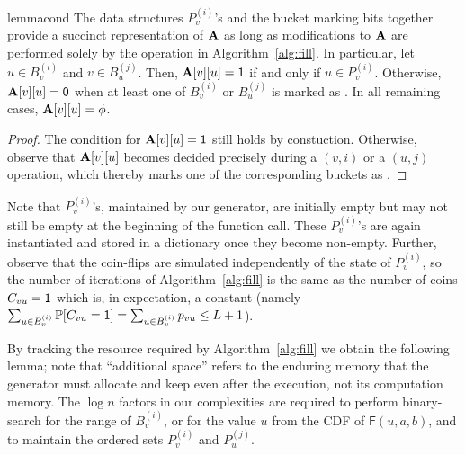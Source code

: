 \begin{restatable}{lemma}{cond}\label{lem:cond-0-fill}
The data structures $P_v^{(i)}$'s and the bucket marking bits together provide a succinct representation of $\mathbf{A}$ as long as modifications to $\mathbf{A}$ are performed solely by the  operation in Algorithm~\ref{alg:fill}. In particular, let $u \in B^{(i)}_v$ and $v \in B_u^{(j)}$. Then, $\mathbf{A}[v][u]=\mathsf{1}$ if and only if $u \in P_v^{(i)}$. Otherwise, $\mathbf{A}[v][u]=\mathsf{0}$ when at least one of $B^{(i)}_v$ or $B_u^{(j)}$ is marked as \filled. In all remaining cases, $\mathbf{A}[v][u]=\phi$.
\end{restatable}
\begin{proof}
The condition for $\mathbf{A}[v][u]=\mathsf{1}$ still holds by constuction. Otherwise, observe that $\mathbf{A}[v][u]$ becomes decided precisely during a $(v,i)$ or a $(u,j)$ operation, which thereby marks one of the corresponding buckets as \filled.
\end{proof}


Note that $P_v^{(i)}$'s, maintained by our generator, are initially empty but may not still be empty at the beginning of the  function call. These $P_v^{(i)}$'s are again instantiated and stored in a dictionary once they become non-empty.
Further, observe that the coin-flips are simulated independently of the state of $P_v^{(i)}$, so the number of iterations of Algorithm~\ref{alg:fill} is the same as the number of coins $C_{vu} = \mathsf{1}$ which is, in expectation, a constant (namely $\sum_{u\in B^{(i)}_v} \mathbb P[C_{vu}=\mathsf{1}] = \sum_{u\in B^{(i)}_v} p_{vu} \leq L+1$). %



By tracking the resource required by Algorithm~\ref{alg:fill} we obtain the following lemma; note that ``additional space'' refers to the enduring memory that the generator must allocate and keep even after the execution, not its computation memory. The $\log n$ factors in our complexities are required to perform binary-search for the range of $B^{(i)}_v$, or for the value $u$ from the CDF of $\mathsf{F}(u,a,b)$, and to maintain the ordered sets $P_v^{(i)}$ and $P_u^{(j)}$.

